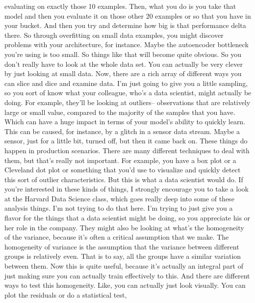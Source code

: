     evaluating on exactly those 10 examples.
    Then, what you do is you take that model and then
    you evaluate it on those other 20 examples
    or so that you have in your bucket.
    And then you try and determine how big is that performance delta there.
    So through overfitting on small data examples,
    you might discover problems with your architecture, for instance.
    Maybe the autoencoder bottleneck you're using is too small.
    So things like that will become quite obvious.
    So you don't really have to look at the whole data set.
    You can actually be very clever by just looking at small data.
    Now, there are a rich array of different ways
    you can slice and dice and examine data.
    I'm just going to give you a little sampling,
    so you sort of know what your colleague, who's a data scientist,
    might actually be doing.
    For example, they'll be looking at outliers-- observations that
    are relatively large or small value, compared to the majority of the samples
    that you have.
    Which can have a huge impact in terms of your model's ability to quickly learn.
    This can be caused, for instance, by a glitch in a sensor data stream.
    Maybe a sensor, just for a little bit, turned off, but then it came back on.
    These things do happen in production scenarios.
    There are many different techniques to deal with them,
    but that's really not important.
    For example, you have a box plot or a Cleveland dot plot
    or something that you'd use to visualize and quickly detect
    this sort of outlier characteristics.
    But this is what a data scientist would do.
    If you're interested in these kinds of things,
    I strongly encourage you to take a look at the Harvard Data Science
    class, which goes really deep into some of these analysis things.
    I'm not trying to do that here.
    I'm trying to just give you a flavor for the things that a data scientist might
    be doing, so you appreciate his or her role in the company.
    They might also be looking at what's the homogeneity of the variance,
    because it's often a critical assumption that we make.
    The homogeneity of variance is the assumption
    that the variance between different groups is relatively even.
    That is to say, all the groups have a similar variation between them.
    Now this is quite useful, because it's actually
    an integral part of just making sure you can actually train effectively to this.
    And there are different ways to test this homogeneity.
    Like, you can actually just look visually.
    You can plot the residuals or do a statistical test,

